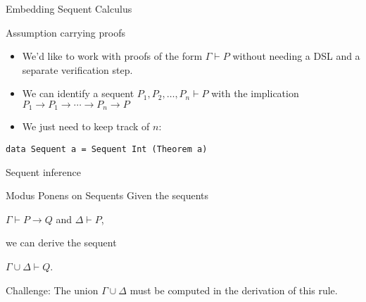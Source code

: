 \documentclass[presentation]{beamer}
\begin{document}
\begin{frame}[fragile,label={sec:orgheadline18}]{Embedding Sequent Calculus}
 \begin{block}{Assumption carrying proofs}
\begin{itemize}
\item We'd like to work with proofs of the form \(\Gamma \vdash P\) without needing a
DSL and a separate verification step.
\item We can identify a sequent \({P_1, P_2, \ldots, P_n} \vdash P\) with the implication
\(P_1 \rightarrow P_1 \rightarrow \cdots \rightarrow P_n \rightarrow P\)
\item We just need to keep track of \(n\):
\end{itemize}

\begin{verbatim}
data Sequent a = Sequent Int (Theorem a)
\end{verbatim}
\end{block}
\end{frame}

\begin{frame}[label={sec:orgheadline19}]{Sequent inference}
\begin{block}{Modus Ponens on Sequents}
Given the sequents 

\begin{center}
\(\Gamma \vdash P \rightarrow Q\) and \(\Delta \vdash P\), 
\end{center}

we can derive the sequent 

\begin{center}
\(\Gamma \cup \Delta \vdash Q\).
\end{center}

Challenge: The union \(\Gamma \cup \Delta\) must be computed in the derivation of this
rule.
\end{block}
\end{frame}
\end{document}
